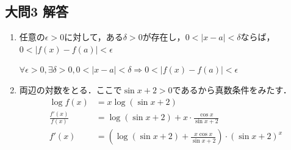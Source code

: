 \documentclass[dvipdfmx]{jsreport}
\begin{document}
\subsection{大問3 解答}
\begin{souanswer} %
\begin{enumerate}
	\item 任意の$\epsilon> 0$に対して，ある$\delta> 0$が存在し，$	0< |x- a|< \delta$ならば，$0< |f(x)- f(a)|< \epsilon$
\begin{tcolorbox}[title= 論理記号ver.]
	$\forall \epsilon>0, \exists \delta> 0, 0< |x- a|< \delta \Longrightarrow 0< |f(x)- f(a)|< \epsilon$
\end{tcolorbox}

	\item 両辺の対数をとる．ここで$\sin{x}+ 2> 0$であるから真数条件をみたす．
\begin{align*}
	\log{f(x)}&= x\log{(\sin{x}+ 2)}\\
	\frac{f'(x)}{f(x)}&= \log{(\sin{x}+ 2)}+ x\cdot \frac{\cos{x}}{\sin{x}+ 2}\\
	f'(x)&= \left(\log{(\sin{x}+ 2)}+ \frac{x\cos{x}}{\sin{x}+ 2}\right)\cdot(\sin{x}+ 2)^x
\end{align*}


\end{enumerate}
\end{souanswer}
\end{document}
